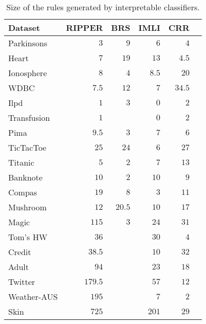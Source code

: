 \begin{table*}[h]		
	\begin{center}
		\begin{tabular}{l   r r r r r  }
			\toprule
			{Dataset}  & RIPPER & BRS & IMLI & CRR\\\midrule
			\multirow{1}{*}{ Parkinsons}   & $   3 $    & $   9 $    & $   6 $    & $   4 $   \\ 
			\multirow{1}{*}{ Heart}   & $   7 $    & $   19 $    & $   13 $    & $   4.5  $   \\ 
			\multirow{1}{*}{ Ionosphere}   & $   8 $    & $   4 $    & $   8.5  $    & $   20 $   \\ 
			\multirow{1}{*}{ WDBC}   & $   7.5  $    & $   12 $    & $   7 $    & $   34.5  $   \\ 
			\multirow{1}{*}{ Ilpd}   & $   1 $    & $   3 $    & $   0 $    & $   2 $   \\ 
			\multirow{1}{*}{ Transfusion}   & $   1 $     &  \multicolumn{1}{c}{\textemdash}      & $   0 $    & $   2 $   \\ 
			\multirow{1}{*}{ Pima}   & $   9.5  $    & $   3 $    & $   7 $    & $   6 $   \\ 
			\multirow{1}{*}{ TicTacToe}   & $   25 $    & $   24 $    & $   6 $    & $   27 $   \\ 
			\multirow{1}{*}{ Titanic}   & $   5 $    & $   2 $    & $   7 $    & $   13 $   \\ 
			\multirow{1}{*}{ Banknote}   & $   10 $    & $   2 $    & $   10 $    & $   9 $   \\ 
			\multirow{1}{*}{ Compas}   & $   19 $    & $   8 $    & $   3 $    & $   11 $   \\ 
			\multirow{1}{*}{ Mushroom}   & $   12 $    & $   20.5  $    & $   10 $    & $   17 $   \\ 
			\multirow{1}{*}{ Magic}   & $   115 $    & $   3 $    & $   24 $    & $   31 $   \\ 
			\multirow{1}{*}{ Tom's HW}   & $   36 $     &  \multicolumn{1}{c}{\textemdash}      & $   30 $    & $   4 $   \\ 
			\multirow{1}{*}{ Credit}   & $   38.5  $     &  \multicolumn{1}{c}{\textemdash}      & $   10 $    & $   32 $   \\ 
			\multirow{1}{*}{ Adult}   & $   94 $     &  \multicolumn{1}{c}{\textemdash}      & $   23 $    & $   18 $   \\ 
			\multirow{1}{*}{ Twitter}   & $   179.5  $     &  \multicolumn{1}{c}{\textemdash}      & $   57 $    & $   12 $   \\ 
			\multirow{1}{*}{ Weather-AUS}   & $   195 $     &  \multicolumn{1}{c}{\textemdash}      & $   7 $    & $   2 $   \\ 
			\multirow{1}{*}{ Skin}   & $   725 $     &  \multicolumn{1}{c}{\textemdash}      & $   201 $    & $   29 $   \\ 
			\bottomrule
		\end{tabular}
	\end{center}
	\caption{Size of the rules generated by  interpretable classifiers.}
	\label{tab:rule_size}	
\end{table*}


